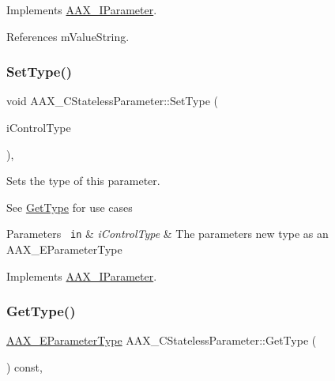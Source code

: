 Implements \mbox{\hyperlink{a01857_a0f1ecef3d86f0ea1fef4255a9294d1df}{A\+A\+X\+\_\+\+I\+Parameter}}.



References m\+Value\+String.

\mbox{\label{a01541_ad8043727979721f1c19f69396b5bce92}} 
\subsubsection{\texorpdfstring{SetType()}{SetType()}}
{\footnotesize\ttfamily void A\+A\+X\+\_\+\+C\+Stateless\+Parameter\+::\+Set\+Type (\begin{DoxyParamCaption}\item[{\mbox{\hyperlink{a00491_a4cd0f189daa9a60cf36883c56344bb2e}{A\+A\+X\+\_\+\+E\+Parameter\+Type}}}]{i\+Control\+Type }\end{DoxyParamCaption})\hspace{0.3cm}{\ttfamily [inline]}, {\ttfamily [virtual]}}



Sets the type of this parameter. 

See \mbox{\hyperlink{a01541_a47efcdd3c7c5672fff2f9fbcc50230df}{Get\+Type}} for use cases


\begin{DoxyParams}[1]{Parameters}
\mbox{\texttt{ in}}  & {\em i\+Control\+Type} & The parameter\textquotesingle{}s new type as an A\+A\+X\+\_\+\+E\+Parameter\+Type \\
\hline
\end{DoxyParams}


Implements \mbox{\hyperlink{a01857_ac03b38e048e92dd2ec086f9041b52c54}{A\+A\+X\+\_\+\+I\+Parameter}}.

\mbox{\label{a01541_a47efcdd3c7c5672fff2f9fbcc50230df}} 
\subsubsection{\texorpdfstring{GetType()}{GetType()}}
{\footnotesize\ttfamily \mbox{\hyperlink{a00491_a4cd0f189daa9a60cf36883c56344bb2e}{A\+A\+X\+\_\+\+E\+Parameter\+Type}} A\+A\+X\+\_\+\+C\+Stateless\+Parameter\+::\+Get\+Type (\begin{DoxyParamCaption}{ }\end{DoxyParamCaption}) const\hspace{0.3cm}{\ttfamily [inline]}, {\ttfamily [virtual]}}



